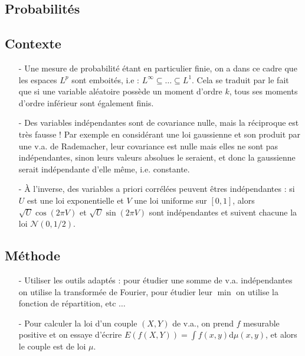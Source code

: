\documentclass[11pt,a4paper]{article}
\begin{document}
\newpage
\begin{center}
\section*{Probabilités} 
\end{center}





\subsection*{Contexte}
\begin{itemize}
\item[-] Une mesure de probabilité étant en particulier finie, on a dans ce cadre que les espaces $L^p$ sont emboités, i.e : $L^\infty \subseteq \dots \subseteq L^1$. Cela se traduit par le fait que si une variable aléatoire possède un moment d'ordre $k$, tous ses moments d'ordre inférieur sont également finis.
\item[-] Des variables indépendantes sont de covariance nulle, mais la réciproque est très fausse ! Par exemple en considérant une loi gaussienne et son produit par une v.a. de Rademacher, leur covariance est nulle mais elles ne sont pas indépendantes, sinon leurs valeurs absolues le seraient, et donc la gaussienne serait indépendante d'elle même, i.e. constante.
\item[-] À l'inverse, des variables a priori corrélées peuvent êtres indépendantes : si $U$ est une loi exponentielle et $V$ une loi uniforme sur $[0,1]$, alors $\sqrt{U}\cos(2\pi V)$ et $\sqrt{U}\sin(2\pi V)$ sont indépendantes et suivent chacune la loi $\mathcal{N}(0,1/2)$.
\end{itemize}

\subsection*{Méthode}
\begin{itemize}
\item[-] Utiliser les outils adaptés : pour étudier une somme de v.a. indépendantes on utilise la transformée de Fourier, pour étudier leur $\min$ on utilise la fonction de répartition, etc $\dots$
\item[-] Pour calculer la loi d'un couple $(X,Y)$ de v.a., on prend $f$ mesurable positive et on essaye d'écrire $\displaystyle E\left(f(X,Y)\right) = \int f(x,y) \mathrm{d}\mu(x,y)$, et alors le couple est de loi $\mu$.
\end{itemize}
\end{document}
